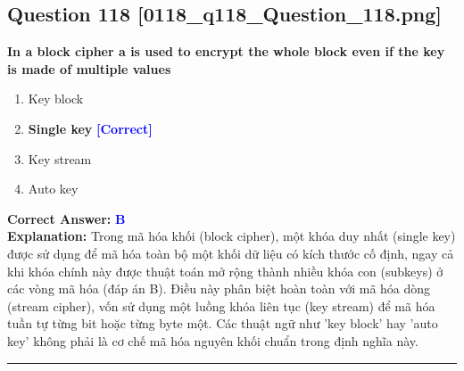 \documentclass[11pt,a4paper]{article}
\begin{document}
\begin{minipage}{\textwidth}
\subsection*{Question 118 \quad \footnotesize{[0118\_q118\_Question\_118.png]}}
\noindent \textbf{In a block cipher a is used to encrypt the whole block even if the key is made of multiple values}

\begin{enumerate}[label=\Alph*.]
    \item Key block
    \item \textbf{Single key} \hfill \textcolor{blue}{\textbf{[Correct]}}
    \item Key stream
    \item Auto key
\end{enumerate}

\noindent \textbf{Correct Answer:} \textcolor{blue}{\textbf{B}} \\[2pt]
\noindent \textbf{Explanation:} Trong mã hóa khối (block cipher), một khóa duy nhất (single key) được sử dụng để mã hóa toàn bộ một khối dữ liệu có kích thước cố định, ngay cả khi khóa chính này được thuật toán mở rộng thành nhiều khóa con (subkeys) ở các vòng mã hóa (đáp án B). Điều này phân biệt hoàn toàn với mã hóa dòng (stream cipher), vốn sử dụng một luồng khóa liên tục (key stream) để mã hóa tuần tự từng bit hoặc từng byte một. Các thuật ngữ như 'key block' hay 'auto key' không phải là cơ chế mã hóa nguyên khối chuẩn trong định nghĩa này.

\par\vspace{0.3cm}
\hrule
\vspace{0.3cm}
\end{minipage}
\end{document}
